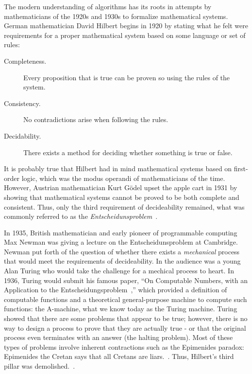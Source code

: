 The modern understanding of algorithms has its roots in attempts by mathematicians of the 1920s and 1930s to
formalize mathematical systems.  German mathematician David Hilbert begins in 1920 by stating what he felt were
requirements for a proper mathematical system based on some language or set of rules:

\begin{description}
\item[Completeness.] Every proposition that is true can be proven so using the rules of the system.
\item[Consistency.] No contradictions arise when following the rules.
\item[Decidability.] There exists a method for deciding whether something is true or false.
\end{description}

It is probably true that Hilbert had in mind mathematical systems based on first-order logic, which was the modus
operandi of mathematicians of the time.  However, Austrian mathematician Kurt G\"{o}del upset the apple cart in
1931 by showing that mathematical systems cannot be proved to be both complete and consistent.  Thus, only the
third requirement of decideability remained, what was commonly referred to as the
\emph{Entscheidunsproblem}~\cite{dturing}.

In 1935, British mathematician and early pioneer of programmable computing Max Newman was giving a lecture on the
Entscheidunsproblem at Cambridge.  Newman put forth of the question of whether there exists a \emph{mechanical}
process that would meet the requirements of decideability.  In the audience was a young Alan Turing who would take
the challenge for a mechical process to heart.  In 1936, Turing would submit his famous paper, ``On Computable
Numbers, with an Application to the Entscheidungsproblem~\cite{aturing},'' which provided a definition of
computable functions and a theoretical general-purpose machine to compute such functions: the A-machine, what we
know today as the Turing machine.  Turing showed that there are some problems that appear to be true; however,
there is no way to design a process to prove that they are actually true - or that the original process even
terminates with an answer (the halting problem).  Most of these types of problems involve inherent contractions
such as the Epimenides paradox: Epimenides the Cretan says that all Cretans are liars.~\cite{dturing}.  Thus,
Hilbert's third pillar was demolished.~\cite{dturing}.


